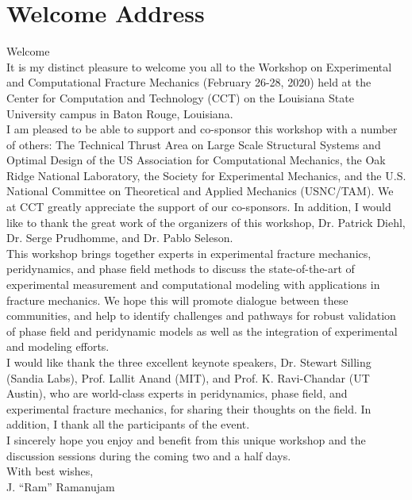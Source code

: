 \documentclass[12pt,letterpaper]{book}
\begin{document}
\chapter{Welcome Address}
Welcome\\\newline
\noindent
It is my distinct pleasure to welcome you all to the Workshop on Experimental and Computational Fracture Mechanics (February 26-28, 2020) held at the Center for Computation and Technology (CCT) on the Louisiana State University campus in Baton Rouge, Louisiana.\\\newline
\noindent
I am pleased to be able to support and co-sponsor this workshop with a number of others: The Technical Thrust Area on Large Scale Structural Systems and Optimal Design of the US Association for Computational Mechanics, the Oak Ridge National Laboratory, the Society for Experimental Mechanics, and the U.S. National Committee on Theoretical and Applied Mechanics (USNC/TAM). We at CCT greatly appreciate the support of our co-sponsors. In addition, I would like to thank the great work of the organizers of this workshop, Dr. Patrick Diehl, Dr. Serge Prudhomme, and Dr. Pablo Seleson.\\\newline
\noindent
This workshop brings together experts in experimental fracture mechanics, peridynamics, and phase field methods to discuss the state-of-the-art of experimental measurement and computational modeling with applications in fracture mechanics. We hope this will promote dialogue between these communities, and help to identify challenges and pathways for robust validation of phase field and peridynamic models as well as the integration of experimental and modeling efforts.\\\newline
\noindent
I would like thank the three excellent keynote speakers, Dr. Stewart Silling (Sandia Labs), Prof. Lallit Anand (MIT), and Prof. K. Ravi-Chandar (UT Austin), who are world-class experts in peridynamics, phase field, and experimental fracture mechanics, for sharing their thoughts on the field. In addition, I thank all the participants of the event.\\\newline
\noindent
I sincerely hope you enjoy and benefit from this unique workshop and the discussion sessions during the coming two and a half days.\\\newline
\noindent
With best wishes,\\\newline
\noindent
J. “Ram” Ramanujam
\end{document}
